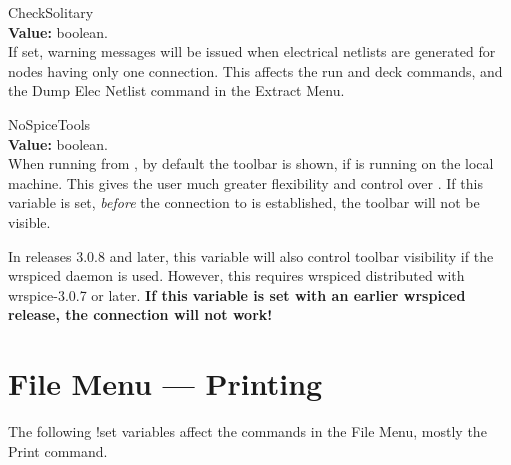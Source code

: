 \begin{description}
\item{\et CheckSolitary}\\
{\bf Value:} boolean.\\
If set, warning messages will be issued when electrical netlists are
generated for nodes having only one connection.  This affects the {\cb
run} and {\cb deck} commands, and the {\cb Dump Elec Netlist} command
in the {\cb Extract Menu}.

\item{\et NoSpiceTools}\\
{\bf Value:} boolean.\\
When running {\WRspice} from {\Xic}, by default the {\WRspice} toolbar
is shown, if {\WRspice} is running on the local machine.  This gives
the user much greater flexibility and control over {\WRspice}.  If
this variable is set, {\it before} the connection to {\WRspice} is
established, the toolbar will not be visible.

In releases 3.0.8 and later, this variable will also control toolbar
visibility if the {\vt wrspiced} daemon is used.  However, this
requires {\vt wrspiced} distributed with wrspice-3.0.7 or later.  {\bf
If this variable is set with an earlier {\vt wrspiced} release, the
{\WRspice} connection will not work!}
\end{description}


\section{File Menu --- Printing}

The following {\cb !set} variables affect the commands in the {\cb File
Menu}, mostly the {\cb Print} command.

